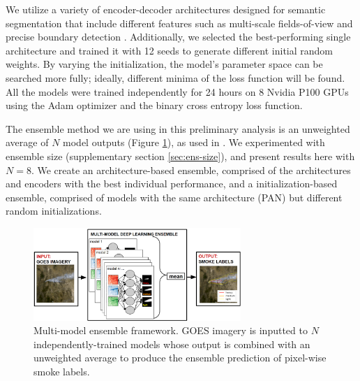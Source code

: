 \documentclass{article}
\begin{document}
We utilize a variety of encoder-decoder architectures designed for semantic segmentation that include different features such as multi-scale fields-of-view and precise boundary detection \citep{dlv3p,PAN,UNetpp}. Additionally, we selected the best-performing single architecture and trained it with 12 seeds to generate different initial random weights. By varying the initialization, the model's parameter space can be searched more fully; ideally, different minima of the loss function will be found. All the models were trained independently for 24 hours on 8 Nvidia P100 GPUs using the Adam optimizer and the binary cross entropy loss function. 

The ensemble method we are using in this preliminary analysis is an unweighted average of $N$ model outputs (Figure \ref{fig:ensemble_framework}), as used in \citep{ensemble-fire-Sivanuja, nn-ensemble2}. We experimented with ensemble size (supplementary section \ref{sec:ens-size}), and present results here with $N=8$. We create an architecture-based ensemble, comprised of the architectures and encoders with the best individual performance, and a initialization-based ensemble, comprised of models with the same architecture (PAN) but different random initializations.


\begin{figure}
    \centering
    \includegraphics[width=0.7\textwidth]{ensemble_framework.png}
    \caption{\RaggedRight Multi-model ensemble framework. GOES imagery is inputted to $N$ independently-trained models whose output is combined with an unweighted average to produce the ensemble prediction of pixel-wise smoke labels.}
    \label{fig:ensemble_framework}
\end{figure}
\end{document}
